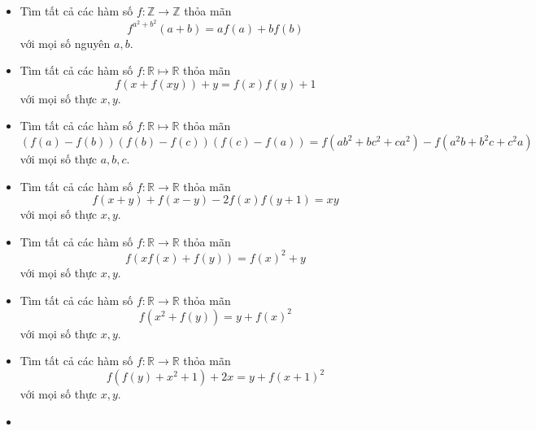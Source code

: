 \documentclass[11pt]{scrartcl}
\begin{document}
\begin{itemize}[label=, leftmargin=0em, itemsep=-0em]
    \item \begin{btvn}
        Tìm tất cả các hàm số $f: \mathbb{Z} \to \mathbb{Z}$ thỏa mãn
        \[f^{a^{2} + b^{2}}(a+b) = af(a) +bf(b)\]
        với mọi số nguyên $a,b$.
    \end{btvn}

    \item \begin{btvn}
        Tìm tất cả các hàm số $f : \mathbb{R} \mapsto \mathbb{R}$ thỏa mãn
        $$f(x+f(xy))+y=f(x)f(y)+1$$
        với mọi số thực $x,y$.
    \end{btvn}

    \item \begin{btvn}
        Tìm tất cả các hàm số $f : \mathbb{R} \mapsto \mathbb{R}$ thỏa mãn
        $$(f(a)-f(b))(f(b)-f(c))(f(c)-f(a)) = f(ab^2+bc^2+ca^2) - f(a^2b+b^2c+c^2a)$$
        với mọi số thực $a,b,c$.
    \end{btvn}
    \item \begin{btvn}
        Tìm tất cả các hàm số $f: \mathbb{R} \to \mathbb{R}$ thỏa mãn
        \[
            f(x + y) + f(x - y) - 2f(x)f(y + 1) = xy
        \]
        với mọi số thực $x,y$.
    \end{btvn}
    \item \begin{btvn}
        Tìm tất cả các hàm số $f: \mathbb{R} \to \mathbb{R}$ thỏa mãn
        \[
            f(xf(x) + f(y)) = f(x)^2 + y
        \]
        với mọi số thực $x,y$.
    \end{btvn}
    \item \begin{btvn}
        Tìm tất cả các hàm số $f: \mathbb{R} \to \mathbb{R}$ thỏa mãn
        \[
            f(x^2 + f(y)) = y + f(x)^2
        \]
        với mọi số thực $x,y$.
    \end{btvn}
    \item \begin{btvn}
        Tìm tất cả các hàm số $f: \mathbb{R} \to \mathbb{R}$ thỏa mãn
        \[
            f(f(y) + x^2 + 1) + 2x = y + f(x + 1)^2
        \]
        với mọi số thực $x,y$.
    \end{btvn}
    \item \begin{btvn}

\end{btvn}
\end{itemize}
\end{document}
